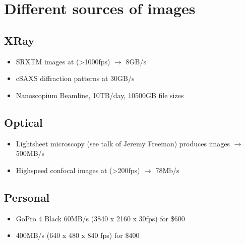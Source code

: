 \documentclass[letterpaper,10pt,english]{sphinxmanual}
\begin{document}
\section{Different sources of images}
\label{\detokenize{01-Introduction:different-sources-of-images}}

\subsection{X\sphinxhyphen{}Ray}
\label{\detokenize{01-Introduction:x-ray}}\begin{itemize}
\item {} 
\sphinxAtStartPar
SRXTM images at (\textgreater{}1000fps) \(\rightarrow\) 8GB/s

\item {} 
\sphinxAtStartPar
cSAXS diffraction patterns at 30GB/s

\item {} 
\sphinxAtStartPar
Nanoscopium Beamline, 10TB/day, 10\sphinxhyphen{}500GB file sizes

\end{itemize}


\subsection{Optical}
\label{\detokenize{01-Introduction:optical}}\begin{itemize}
\item {} 
\sphinxAtStartPar
Light\sphinxhyphen{}sheet microscopy (see talk of Jeremy Freeman) produces images \(\rightarrow\) 500MB/s

\item {} 
\sphinxAtStartPar
High\sphinxhyphen{}speed confocal images at (\textgreater{}200fps) \(\rightarrow\) 78Mb/s

\end{itemize}


\subsection{Personal}
\label{\detokenize{01-Introduction:personal}}\begin{itemize}
\item {} 
\sphinxAtStartPar
GoPro 4 Black \sphinxhyphen{} 60MB/s (3840 x 2160 x 30fps) for \$600

\item {} 
\sphinxAtStartPar
{} \sphinxhyphen{} 400MB/s (640 x 480 x 840 fps) for \$400

\end{itemize}
\end{document}
